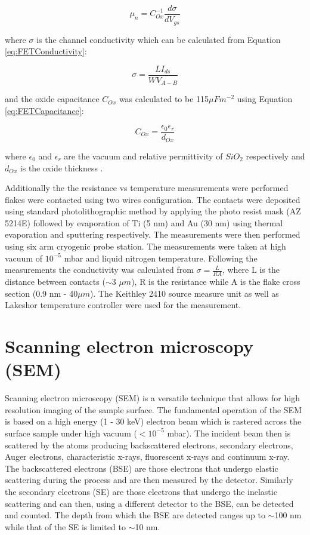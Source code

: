\begin{equation}
\mu_{n} = C_{Ox}^{-1}\frac{d{\sigma}}{dV_{gs}}
\label{eq:FETMobility}
\end{equation}

where $\sigma$ is the channel conductivity which can be calculated from Equation \ref{eq:FETConductivity}:

\begin{equation}
\sigma = \frac{LI_{ds}}{W V_{A-B}}
\label{eq:FETConductivity}
\end{equation}

and the oxide capacitance $C_{Ox}$ was calculated to be 115$\mu F m^{-2}$ using Equation \ref{eq:FETCapacitance}:

\begin{equation}
C_{Ox} = \frac{{\epsilon}_0{\epsilon}_r}{d_{Ox}}
\label{eq:FETCapacitance}
\end{equation}

where ${\epsilon}_0$ and ${\epsilon}_r$ are the vacuum and relative permittivity of $SiO_2$ respectively and $d_{Ox}$ is the oxide thickness \cite{Sze2006}.

Additionally the the resistance vs temperature measurements were performed flakes were contacted using two wires configuration. The contacts were deposited using standard photolithographic method by applying the photo resist mask (AZ 5214E) followed by evaporation of Ti (5 nm) and Au (30 nm) using thermal evaporation and sputtering respectively. The measurements were then performed using six arm cryogenic probe station. The measurements were taken at high vacuum of $10^{-5}$ mbar and liquid nitrogen temperature. Following the measurements the conductivity was calculated from $\sigma = \frac{L}{RA}$, where L is the distance between contacts ($\sim$3 $\mu m$), R is the resistance while A is the flake cross section (0.9 nm - 40$\mu m$). The Keithley 2410 source measure unit as well as Lakeshor temperature controller were used for the measurement.

\section{Scanning electron microscopy (SEM)}

Scanning electron microscopy (SEM) is a versatile technique that allows for high resolution imaging of the sample surface. The fundamental operation of the SEM is based on a high energy (1 - 30 keV) electron beam which is rastered across the surface sample under high vacuum ($<10^{-5}$ mbar). The incident beam then is scattered by the atoms producing backscattered electrons, secondary electrons, Auger electrons, characteristic x-rays, fluorescent x-rays and continuum x-ray. The backscattered electrons (BSE) are those electrons that undergo elastic scattering during the process and are then measured by the detector. Similarly the secondary electrons (SE) are those electrons that undergo the inelastic scattering and can then, using a different detector to the BSE, can be detected and counted. The depth from which the BSE are detected ranges up to $\sim$100 nm while that of the SE is limited to $\sim$10 nm.


